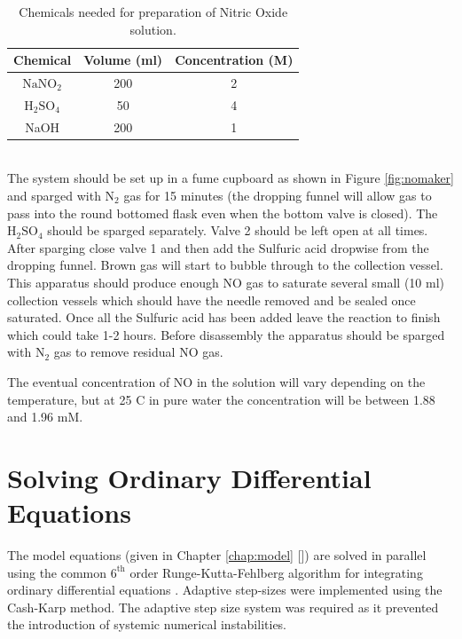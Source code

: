 \begin{table}[here]
\begin{center}
\begin{tabular}{ccc}
\toprule
\textbf{Chemical} & \textbf{Volume (ml)} & \textbf{Concentration (M)} \\
\midrule
$\textrm{NaNO}_2$ & 200 & 2 \\
$\textrm{H}_2\textrm{SO}_4$ & 50 & 4 \\
NaOH & 200 & 1 \\
\bottomrule
\end{tabular} 
\end{center}
\caption{Chemicals needed for preparation of Nitric Oxide solution.
\label{tab:nomakerchem}}
\end{table}\\
The system should be set up in a fume cupboard as shown in Figure \ref{fig:nomaker} and sparged with $\textrm{N}_2$ gas for 15 minutes (the dropping funnel will allow gas to pass into the round bottomed flask even when the bottom valve is closed). The $\textrm{H}_2\textrm{SO}_4$ should be sparged separately. Valve 2 should be left open at all times. After sparging close valve 1 and then add the Sulfuric acid dropwise from the dropping funnel. Brown gas will start to bubble through to the collection vessel. This apparatus should produce enough NO gas to saturate several small (10 ml) collection vessels which should have the needle removed and be sealed once saturated. Once all the Sulfuric acid has been added leave the reaction to finish which could take 1-2 hours. Before disassembly the apparatus should be sparged with $\textrm{N}_2$ gas to remove residual NO gas.

The eventual concentration of NO in the solution will vary depending on the temperature, but at 25 \textdegree{}C in pure water the concentration will be between 1.88 and 1.96 mM\cite{Aga2008,Cole2008}.

\section{Solving Ordinary Differential Equations}
The model equations (given in Chapter \ref{chap:model} []) are solved in parallel using the common $\mathrm{6}^\mathrm{th}$ order Runge-Kutta-Fehlberg algorithm for integrating ordinary differential equations \cite{Butcher2003}. Adaptive step-sizes were implemented using the Cash-Karp method\cite{Cash1990}. The adaptive step size system was required as it prevented the introduction of systemic numerical instabilities.

